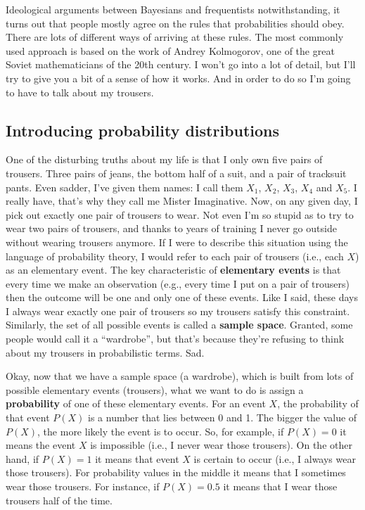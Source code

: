 \documentclass[
  a4paper,
]{book}
\begin{document}
Ideological arguments between Bayesians and frequentists
notwithstanding, it turns out that people mostly agree on the rules that
probabilities should obey. There are lots of different ways of arriving
at these rules. The most commonly used approach is based on the work of
Andrey Kolmogorov, one of the great Soviet mathematicians of the 20th
century. I won't go into a lot of detail, but I'll try to give you a bit
of a sense of how it works. And in order to do so I'm going to have to
talk about my trousers.

\hypertarget{introducing-probability-distributions}{%
\subsection{Introducing probability
distributions}\label{introducing-probability-distributions}}

One of the disturbing truths about my life is that I only own five pairs
of trousers. Three pairs of jeans, the bottom half of a suit, and a pair
of tracksuit pants. Even sadder, I've given them names: I call them
\(X_1\), \(X_2\), \(X_3\), \(X_4\) and \(X_5\). I really have, that's
why they call me Mister Imaginative. Now, on any given day, I pick out
exactly one pair of trousers to wear. Not even I'm so stupid as to try
to wear two pairs of trousers, and thanks to years of training I never
go outside without wearing trousers anymore. If I were to describe this
situation using the language of probability theory, I would refer to
each pair of trousers (i.e., each \(X\)) as an elementary event. The key
characteristic of \textbf{elementary events} is that every time we make
an observation (e.g., every time I put on a pair of trousers) then the
outcome will be one and only one of these events. Like I said, these
days I always wear exactly one pair of trousers so my trousers satisfy
this constraint. Similarly, the set of all possible events is called a
\textbf{sample space}. Granted, some people would call it a
``wardrobe'', but that's because they're refusing to think about my
trousers in probabilistic terms. Sad.

Okay, now that we have a sample space (a wardrobe), which is built from
lots of possible elementary events (trousers), what we want to do is
assign a \textbf{probability} of one of these elementary events. For an
event \(X\), the probability of that event \(P(X)\) is a number that
lies between 0 and 1. The bigger the value of \(P(X)\), the more likely
the event is to occur. So, for example, if \(P(X) = 0\) it means the
event \(X\) is impossible (i.e., I never wear those trousers). On the
other hand, if \(P(X) = 1\) it means that event \(X\) is certain to
occur (i.e., I always wear those trousers). For probability values in
the middle it means that I sometimes wear those trousers. For instance,
if \(P(X) = 0.5\) it means that I wear those trousers half of the time.
\end{document}

